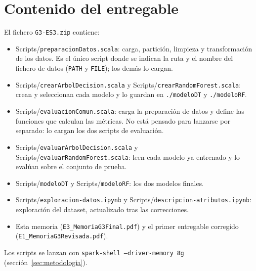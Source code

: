 \documentclass[12pt,a4paper]{article}
\begin{document}
\newpage
{}
{}
\nocite{*}                 %


\newpage
\appendix
\section{Contenido del entregable}
\label{sec:contenido}

El fichero \texttt{G3-ES3.zip} contiene:
\begin{itemize}
    \item Scripts/\texttt{preparacionDatos.scala}: carga, partición, limpieza y
    transformación de los datos. Es el único script donde se indican la ruta
    y el nombre del fichero de datos (\texttt{PATH} y \texttt{FILE}); los
    demás lo cargan.
    \item Scripts/\texttt{crearArbolDecision.scala} y Scripts/\texttt{crearRandomForest.scala}:
    crean y seleccionan cada modelo y lo guardan en \texttt{./modeloDT} y
    \texttt{./modeloRF}.
    \item Scripts/\texttt{evaluacionComun.scala}: carga la preparación de datos y
    define las funciones que calculan las métricas. No está pensado para
    lanzarse por separado: lo cargan los dos scripts de evaluación.
    \item Scripts/\texttt{evaluarArbolDecision.scala} y
    Scripts/\texttt{evaluarRandomForest.scala}: leen cada modelo ya entrenado y lo
    evalúan sobre el conjunto de prueba.
    \item Scripts/\texttt{modeloDT} y Scripts/\texttt{modeloRF}: los dos modelos finales.
    \item Scripts/\texttt{exploracion-datos.ipynb} y Scripts/\texttt{descripcion-atributos.ipynb}: exploración del dataset, actualizado tras las correcciones.
    \item Esta memoria (\texttt{E3\_MemoriaG3Final.pdf}) y el primer entregable corregido (\texttt{E1\_MemoriaG3Revisada.pdf}).
\end{itemize}
Los scripts se lanzan con \texttt{spark-shell --driver-memory 8g}
(sección~\ref{sec:metodologia}).
\end{document}
